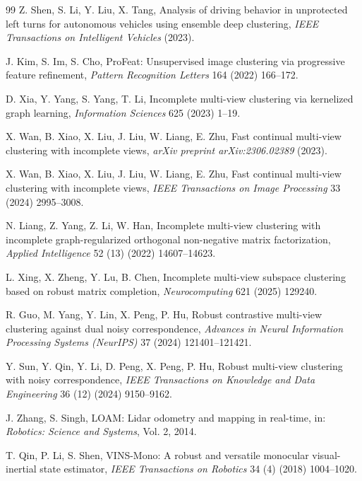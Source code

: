 \documentclass[11pt, a4paper]{article}
\begin{document}
{{{\begin{thebibliography}{99}
Z. Shen, S. Li, Y. Liu, X. Tang, Analysis of driving behavior in unprotected left turns for autonomous vehicles using ensemble deep clustering, \textit{IEEE Transactions on Intelligent Vehicles} (2023).

J. Kim, S. Im, S. Cho, ProFeat: Unsupervised image clustering via progressive feature refinement, \textit{Pattern Recognition Letters} 164 (2022) 166--172.

D. Xia, Y. Yang, S. Yang, T. Li, Incomplete multi-view clustering via kernelized graph learning, \textit{Information Sciences} 625 (2023) 1--19.

X. Wan, B. Xiao, X. Liu, J. Liu, W. Liang, E. Zhu, Fast continual multi-view clustering with incomplete views, \textit{arXiv preprint arXiv:2306.02389} (2023).

X. Wan, B. Xiao, X. Liu, J. Liu, W. Liang, E. Zhu, Fast continual multi-view clustering with incomplete views, \textit{IEEE Transactions on Image Processing} 33 (2024) 2995--3008.

N. Liang, Z. Yang, Z. Li, W. Han, Incomplete multi-view clustering with incomplete graph-regularized orthogonal non-negative matrix factorization, \textit{Applied Intelligence} 52 (13) (2022) 14607--14623.

L. Xing, X. Zheng, Y. Lu, B. Chen, Incomplete multi-view subspace clustering based on robust matrix completion, \textit{Neurocomputing} 621 (2025) 129240.

R. Guo, M. Yang, Y. Lin, X. Peng, P. Hu, Robust contrastive multi-view clustering against dual noisy correspondence, \textit{Advances in Neural Information Processing Systems (NeurIPS)} 37 (2024) 121401--121421.

Y. Sun, Y. Qin, Y. Li, D. Peng, X. Peng, P. Hu, Robust multi-view clustering with noisy correspondence, \textit{IEEE Transactions on Knowledge and Data Engineering} 36 (12) (2024) 9150--9162.

J. Zhang, S. Singh, LOAM: Lidar odometry and mapping in real-time, in: \textit{Robotics: Science and Systems}, Vol. 2, 2014.

T. Qin, P. Li, S. Shen, VINS-Mono: A robust and versatile monocular visual-inertial state estimator, \textit{IEEE Transactions on Robotics} 34 (4) (2018) 1004--1020.


\end{thebibliography}}}}
\end{document}
